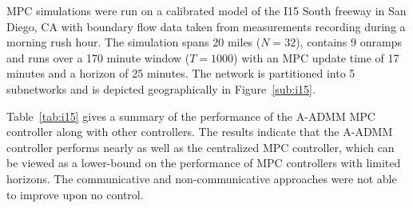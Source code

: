 MPC simulations were run on a calibrated model of the I15 South freeway in San Diego, CA with boundary flow data taken from measurements recording during a morning rush hour. The simulation spans 20 miles ($N=32$), contains 9 onramps and runs over a 170 minute window ($T=1000$) with an MPC update time of 17 minutes and a horizon of 25 minutes. The network is partitioned into 5 subnetworks and is depicted geographically in Figure~\ref{sub:i15}.

Table~\ref{tab:i15} gives a summary of the performance of the A-ADMM MPC controller along with other controllers. The results indicate that the A-ADMM controller performs nearly as well as the centralized MPC controller, which can be viewed as a lower-bound on the performance of MPC 
controllers with limited horizons. The communicative and non-communicative approaches were not able to improve upon no control.
